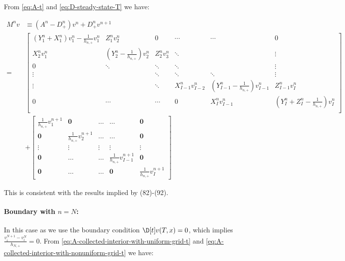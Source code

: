 \documentclass[11pt]{etk-article}
\begin{document}
 From \cref{eq:A-t} and \cref{eq:D-steady-state-T} we have:

\begin{align}
M^n v &\equiv \left(A^n-D_{+}^n\right)v^n+D_{+}^n v^{n+1}\\
=& \begin{bmatrix}
\left(Y^n_1 + X^n_1\right)v_1^n-\frac{1}{h_{n,+}}v_1^n & Z^n_1v_2^{n} & 0  & \cdots & \cdots & 0 \\
X^n_2v_1^n & \left(Y^n_2-\frac{1}{h_{n,+}}\right)v_2^n & Z^n_2v_3^{n} & \ddots& & \vdots \\
0 & \ddots & \ddots & \ddots &  & \vdots \\
\vdots &  & \ddots & \ddots & \ddots  & \vdots \\
\vdots & & \ddots & X^n_{I-1}v_{I-2}^n & \left(Y^n_{I-1}-\frac{1}{h_{n,+}}\right)v_{I-1}^n  & Z^n_{I-1}v_I^n \\
0 & \cdots & \cdots & 0 & X^n_Iv_{I-1}^{n} & \left(Y^n_I+Z^n_I-\frac{1}{h_{n,+}}\right)v_{I}^{n}\\
\end{bmatrix}\\
&+\begin{bmatrix} \frac{1}{h_{n,+}}v_1^{n+1} &\mathbf{0} &\ldots &\ldots &\mathbf{0}\\
\mathbf{0} & \frac{1}{h_{n,+}}v_2^{n+1} & \ldots &\ldots &\mathbf{0}\\
\vdots & \vdots & \vdots &\vdots & \vdots\\
\mathbf{0} & \ldots & \ldots & \frac{1}{h_{n,+}} v_{I-1}^{n+1} &\mathbf{0}\\
\mathbf{0} & \ldots &\ldots & \mathbf{0} & \frac{1}{h_{n,+}} v_{I}^{n+1} \end{bmatrix}
\end{align}

This is consistent with the results implied by (82)-(92).

\paragraph{Boundary with $n=N$:} In this case as we use the boundary condition $\D[t]v(T,x) = 0$, which implies $\frac{v_i^{N+1}-v_i^N}{h_{N,+}}=0$. From \cref{eq:A-collected-interior-with-uniform-grid-t} and \cref{eq:A-collected-interior-with-nonuniform-grid-t} we have:
\end{document}
